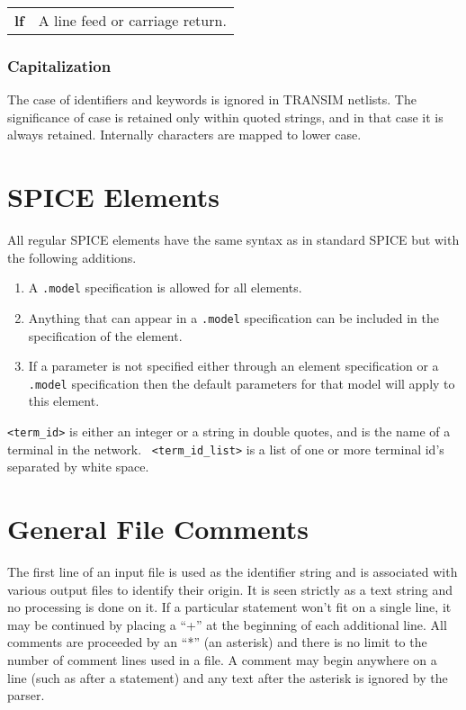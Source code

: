 \begin{tabular}{p{1.5in}p{3in}}
{\bf lf}& A line feed or carriage return.
\end{tabular}

\subsubsection{Capitalization}

The case of identifiers and keywords is ignored in TRANSIM
netlists. The significance of case is retained only within quoted
strings, and in that case it is always retained. Internally
characters are mapped to lower case.

\clearpage
\section{SPICE Elements}

All regular SPICE elements have the same syntax as in standard
SPICE but with the following additions.
\begin{enumerate}
\item A {\tt .model} specification is allowed for all elements.
\item Anything that can appear in a {\tt .model} specification can be
      included in the specification of the element.
\item If a parameter is not specified either through an  element
specification or a {\tt.model} specification then the default
parameters for that model will apply to this element.
\end{enumerate}

{\tt <term\_id>} is either an integer or a string in double
quotes, and is the name of a terminal in the network.  {\tt
<term\_id\_list>} is a list of one or more terminal id's separated
by white space.

\section{General File Comments}
The first line of an input file is used as the identifier string
and is associated with various output files to identify their
origin. It is seen strictly as a text string and no processing is
done on it. If a particular statement won't fit on a single line,
it may be continued by placing a ``+'' at the beginning of each
additional line.  All comments are proceeded by an ``*'' (an
asterisk) and there is no limit to the number of comment lines
used in a file. A comment may begin anywhere on a line (such as
after a statement) and any text after the asterisk is ignored by
the parser.


